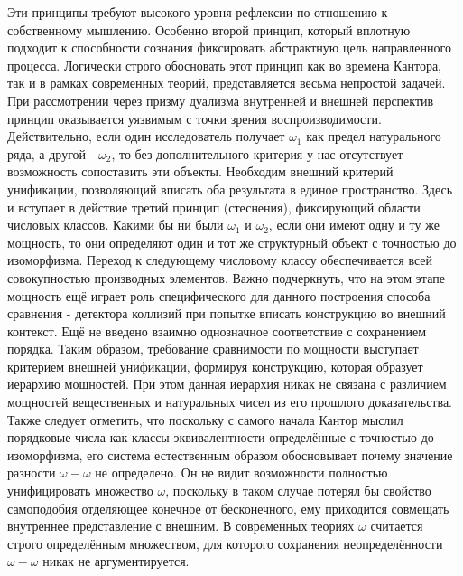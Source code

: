 \documentclass[12pt]{article}
\begin{document}
Эти принципы требуют высокого уровня рефлексии по отношению к собственному мышлению. Особенно второй принцип, который вплотную подходит к способности сознания фиксировать абстрактную цель направленного процесса. Логически строго обосновать этот принцип как во времена Кантора, так и в рамках современных теорий, представляется весьма непростой задачей. При рассмотрении через призму дуализма внутренней и внешней перспектив принцип оказывается уязвимым с точки зрения воспроизводимости. Действительно, если один исследователь получает $\omega_1$ как предел натурального ряда, а другой - $\omega_2$, то без дополнительного критерия у нас отсутствует возможность сопоставить эти объекты. Необходим внешний критерий унификации, позволяющий вписать оба результата в единое пространство. Здесь и вступает в действие третий принцип (стеснения), фиксирующий области числовых классов. Какими бы ни были $\omega_1$ и $\omega_2$, если они имеют одну и ту же мощность, то они определяют один и тот же структурный объект с точностью до изоморфизма. Переход к следующему числовому классу обеспечивается всей совокупностью производных элементов. Важно подчеркнуть, что на этом этапе мощность ещё играет роль специфического для данного построения способа сравнения - детектора коллизий при попытке вписать конструкцию во внешний контекст. Ещё не введено взаимно однозначное соответствие с сохранением порядка. Таким образом, требование сравнимости по мощности выступает критерием внешней унификации, формируя конструкцию, которая образует иерархию мощностей. При этом данная иерархия никак не связана с различием мощностей вещественных и натуральных чисел из его прошлого доказательства. Также следует отметить, что поскольку с самого начала Кантор мыслил порядковые числа как классы эквивалентности определённые с точностью до изоморфизма, его система естественным образом обосновывает почему значение разности $\omega - \omega$ не определено. Он не видит возможности полностью унифицировать множество $\omega$, поскольку в таком случае потерял бы свойство самоподобия отделяющее конечное от бесконечного, ему приходится совмещать внутреннее представление с внешним. В современных теориях $\omega$ считается строго определённым множеством, для которого сохранения неопределённости $\omega - \omega$ никак не аргументируется.
\end{document}
